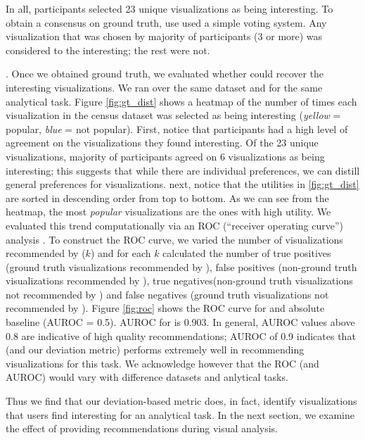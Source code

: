 In all, participants selected 23 unique visualizations as being interesting.
To obtain a consensus on ground truth, use used a simple voting system.
Any visualization that was chosen by majority of participants (3 or more)
was considered to the interesting; the rest were not.

.
Once we obtained ground truth, we evaluated whether \SeeDB could recover
the interesting visualizations.
We ran \SeeDB over the same dataset and for the same analytical task.
Figure \ref{fig:gt_dist} shows a heatmap of the number of times each
visualization in the census dataset was selected as being interesting 
({\em yellow} = popular, {\em blue} = not popular).
First, notice that participants had a high level of agreement on the 
visualizations they found interesting.
Of the 23 unique visualizations, majority of participants agreed on 
6 visualizations as being interesting; this suggests that while
there are individual preferences, we can distill general preferences
for visualizations.
next, notice that the utilities in \ref{fig:gt_dist} are sorted in descending order 
from top to bottom.
As we can see from the heatmap, the most {\em popular} visualizations are
the ones with high utility.
We evaluated this trend computationally via an ROC (``receiver operating curve'')
analysis \cite{}.
To construct the ROC curve, we varied the number of visualizations recommended by 
\SeeDB ($k$) and for each $k$ calculated the 
number of true positives (ground truth visualizations recommended by \SeeDB),
false positives (non-ground truth visualizations recommended by \SeeDB), 
true negatives(non-ground truth visualizations not recommended by \SeeDB) and 
false negatives (ground truth visualizations not recommended by \SeeDB).
Figure \ref{fig:roc} shows the ROC curve for \SeeDB and absolute baseline (AUROC = 0.5).
AUROC for \SeeDB is 0.903. 
In general, AUROC values above 0.8 are indicative of high quality recommendations\cite{};
AUROC of 0.9 indicates that \SeeDB (and our deviation metric) performs extremely well in 
recommending visualizations for this task.
We acknowledge however that the ROC (and AUROC)
would vary with difference datasets and anlytical tasks. 

Thus we find that our deviation-based metric does, in fact, identify visualizations that
users find interesting for an analytical task.
In the next section, we examine the effect of providing recommendations during visual 
analysis.

